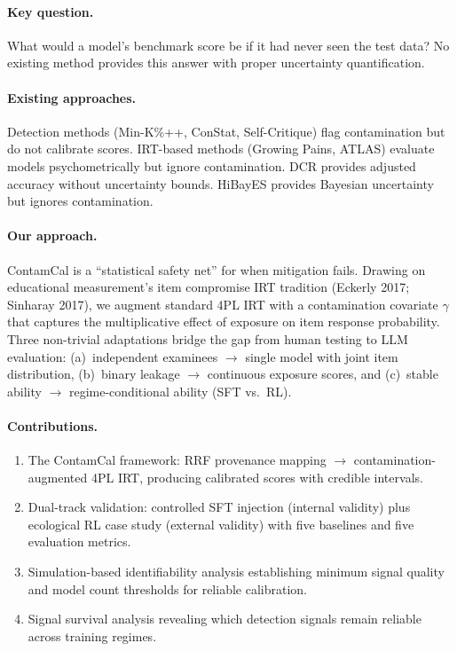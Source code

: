 \documentclass[letterpaper,11pt]{article}
\begin{document}
\paragraph{Key question.} What would a model's benchmark score be if it had never seen the test data? No existing method provides this answer with proper uncertainty quantification.

\paragraph{Existing approaches.} Detection methods (Min-K\%++, ConStat, Self-Critique) flag contamination but do not calibrate scores. IRT-based methods (Growing Pains, ATLAS) evaluate models psychometrically but ignore contamination. DCR provides adjusted accuracy without uncertainty bounds. HiBayES provides Bayesian uncertainty but ignores contamination.

\paragraph{Our approach.} ContamCal is a ``statistical safety net'' for when mitigation fails. Drawing on educational measurement's item compromise IRT tradition (Eckerly 2017; Sinharay 2017), we augment standard 4PL IRT with a contamination covariate $\gamma$ that captures the multiplicative effect of exposure on item response probability. Three non-trivial adaptations bridge the gap from human testing to LLM evaluation: (a)~independent examinees $\to$ single model with joint item distribution, (b)~binary leakage $\to$ continuous exposure scores, and (c)~stable ability $\to$ regime-conditional ability (SFT vs.\ RL).

\paragraph{Contributions.}
\begin{enumerate}
    \item The ContamCal framework: RRF provenance mapping $\to$ contamination-augmented 4PL IRT, producing calibrated scores with credible intervals.
    \item Dual-track validation: controlled SFT injection (internal validity) plus ecological RL case study (external validity) with five baselines and five evaluation metrics.
    \item Simulation-based identifiability analysis establishing minimum signal quality and model count thresholds for reliable calibration.
    \item Signal survival analysis revealing which detection signals remain reliable across training regimes.
\end{enumerate}
\end{document}
